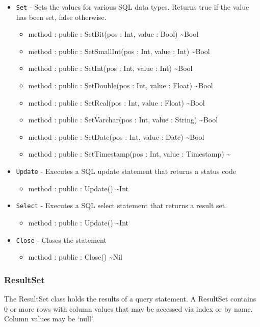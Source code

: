 \documentclass[11pt]{article}
\begin{document}
\begin{itemize}
\item \texttt{Set} - Sets the values for various SQL data types.
  Returns true if the value has been set, false otherwise.
  \begin{itemize}
  \item method : public : SetBit(pos : Int, value : Bool) \textasciitilde Bool
  \item method : public : SetSmallInt(pos : Int, value : Int) \textasciitilde Bool
  \item method : public : SetInt(pos : Int, value : Int) \textasciitilde Bool
  \item method : public : SetDouble(pos : Int, value : Float) \textasciitilde Bool
  \item method : public : SetReal(pos : Int, value : Float) \textasciitilde Bool
  \item method : public : SetVarchar(pos : Int, value : String) \textasciitilde Bool
  \item method : public : SetDate(pos : Int, value : Date) \textasciitilde Bool
  \item method : public : SetTimestamp(pos : Int, value : Timestamp) \textasciitilde
  \end{itemize}
\item \texttt{Update} - Executes a SQL update statement that returns
  a status code
  \begin{itemize}
  \item method : public : Update() \textasciitilde Int
  \end{itemize}
\item \texttt{Select} - Executes a SQL select statement that returns a
  result set.
  \begin{itemize}
  \item method : public : Update() \textasciitilde Int
  \end{itemize}
\item \texttt{Close} - Closes the statement
  \begin{itemize}
  \item method : public : Close() \textasciitilde Nil
  \end{itemize}
\end{itemize}

\subsubsection{ResultSet}
The ResultSet class holds the results of a query statement.  A
ResultSet contains 0 or more rows with column values that may be
accessed via index or by name.  Column values may be `null'.
\end{document}

